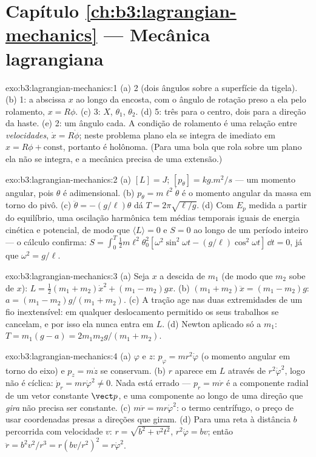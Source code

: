 \section*{Capítulo \ref{ch:b3:lagrangian-mechanics} --- Mecânica lagrangiana}

\begin{solution}{exo:b3:lagrangian-mechanics:1}
(a) 2 (dois ângulos sobre a superfície da tigela). (b) 1: a abscissa
$x$ ao longo da encosta, com o ângulo de rotação preso a ela pelo
rolamento, $x =
R\phi$. (c) 3: $X$, $\theta_1$, $\theta_2$. (d) 5: três para o centro,
dois para a direção da haste. (e) 2: um ângulo cada. A condição de
rolamento é uma relação entre \emph{velocidades}, $\dot x =
R\dot\phi$; neste problema plano ela se integra de imediato em $x = R\phi +
\text{const}$, portanto é holônoma. (Para uma bola que rola sobre um
plano ela não se integra, e a mecânica  precisa de uma
extensão.)
\end{solution}

\begin{solution}{exo:b3:lagrangian-mechanics:2}
(a) $[L] = \unit{J}$; $[p_\theta] = \unit{kg.m^2/s}$ --- um momento
angular, pois $\theta$ é adimensional. (b) $p_\theta =
m\ell^2\dot\theta$ é o momento angular da massa em torno do pivô. (c)
$\ddot\theta = -(g/\ell)\theta$ dá $T = 2\pi\sqrt{\ell/g}$. (d) Com
$E_p$ medida a partir do equilíbrio, uma oscilação harmônica tem médias
temporais iguais de energia cinética e potencial, de modo que $\langle
L\rangle = 0$ e $S = 0$ ao longo de um período inteiro --- o cálculo
confirma: $S = \int_0^T\tfrac12 m\ell^2\theta_0^2[\omega^2\sin^2
\omega t - (g/\ell)\cos^2\omega t]\,\dd t = 0$, já que $\omega^2 =
g/\ell$.
\end{solution}

\begin{solution}{exo:b3:lagrangian-mechanics:3}
(a) Seja $x$ a descida de $m_1$ (de modo que $m_2$ sobe de $x$): $L =
\tfrac12(m_1 + m_2)\dot x^2 + (m_1 - m_2)gx$. (b) $(m_1 + m_2)\ddot x =
(m_1 - m_2)g$: $a = (m_1 - m_2)g/(m_1 + m_2)$. (c) A tração age nas
duas extremidades de um fio inextensível: em qualquer deslocamento
permitido os seus trabalhos se cancelam, e por isso ela nunca entra em
$L$. (d) Newton aplicado só a $m_1$: $T =
m_1(g - a) = 2m_1m_2g/(m_1 + m_2)$.
\end{solution}

\begin{solution}{exo:b3:lagrangian-mechanics:4}
(a) $\varphi$ e $z$: $p_\varphi = mr^2\dot\varphi$ (o momento angular
em torno do eixo) e $p_z = m\dot z$ se conservam. (b) $r$ aparece em
$L$ através de $r^2\dot\varphi^2$, logo não é cíclica: $\dot p_r =
mr\dot\varphi^2 \neq 0$. Nada está errado --- $p_r = m\dot r$ é a
componente radial de um vetor constante $\vect p$, e uma componente ao
longo de uma direção que \emph{gira} não precisa ser constante. (c) $m\ddot r =
mr\dot\varphi^2$: o termo centrífugo, o preço de usar coordenadas
presas a direções que giram. (d) Para uma reta à distância $b$
percorrida com velocidade $v$: $r = \sqrt{b^2 + v^2t^2}$, $r^2\dot\varphi = bv$;
então $\ddot r = b^2v^2/r^3 = r(bv/r^2)^2 = r\dot\varphi^2$.
\end{solution}


